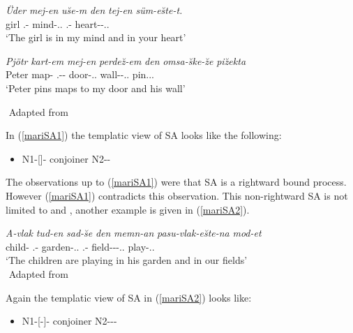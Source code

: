 \begin{exe}
    \ex \label{mariSA1}
    \begin{xlist}
        \ex
        \gll
        \textit{Üder} \textit{mej-en} \textit{u\u{s}e-m} \textit{den} \textit{tej-en} \textit{süm-e\u{s}te-t.} \\ girl {\First}.{\Sg}-{\Gen} mind-{\Poss}.{\First}.{\Sg} {\And} {\Second}.{\Sg}-{\Gen} heart-{\Iness}-{\Poss}.{\Second}.{\Sg} \\
        \glt `The girl is in my mind and in your heart'
        
        \ex 
        \gll 
        \textit{Pjötr} \textit{kart-em} \textit{mej-en} \textit{perde\u{z}-em} \textit{den} \textit{omsa-\u{s}ke-\u{z}e} \textit{pi\u{z}ekta} \\ Peter map-{\Acc} {\First}.{\Sg}-{\Pron}-{\Gen} door-{\Poss}.{\First}.{\Sg} {\And} wall-{\Ill}-{\Poss}.{\Third}.{\Sg} pin.{\Third}.{\Sg}.{\Prs} \\
        \glt `Peter pins maps to my door and his wall'
    \end{xlist}
    ${}$ \hfill Adapted from \cite{guseva2017postsyntactic}
\end{exe}

In (\ref{mariSA1}) the templatic view of SA looks like the following:
\begin{itemize}
    \item N1-[{\Lcase}]-{\Poss} conjoiner N2-{\Lcase}-{\Poss}
\end{itemize}

The observations up to (\ref{mariSA1}) were that SA is a rightward bound process. However (\ref{mariSA1}) contradicts this observation. This non-rightward SA is not limited to {\Poss} and {\Lcase}, another example is given in (\ref{mariSA2}).
\begin{exe}
    \ex \label{mariSA2}
    \gll 
    \textit{A-vlak} \textit{tud-en} \textit{sad-\u{s}e} \textit{den} \textit{memn-an} \textit{pasu-vlak-e\u{s}te-na} \textit{mod-et} \\ child-{\Pl} {\Third}.{\Sg}-{\Gen} garden-{\Poss}.{\Third}.{\Sg} {\And} {\First}.{\Pl}-{\Gen} field-{\Pl}-{\Iness}-{\Poss}.{\First}.{\Pl} play-{\Third}.{\Pl}.{\Prs} \\
    \glt `The children are playing in his garden and in our fields'  \\
    ${}$ \hfill Adapted from \cite{guseva2017postsyntactic}
\end{exe}

Again the templatic view of SA in (\ref{mariSA2}) looks like:
\begin{itemize}
    \item N1-[{\Pl}-{\Iness}]-{\Poss} conjoiner N2-{\Pl}-{\Iness}-{\Poss}
\end{itemize}

